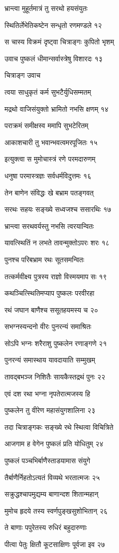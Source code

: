 भ्रान्त्वा मुहूर्तमात्रं तु सरथो हयसंयुतः

स्थितिर्लेभेतिकष्टेन सन्धृतो रणमण्डले १२

स चास्य विक्रमं दृष्ट्वा चित्राङ्गः कुपितो भृशम्

उवाच पुष्कलं धीमान्सर्वास्त्रेषु विशारदः १३

चित्राङ्ग उवाच

त्वया साधुकृतं कर्म सुभटैर्युधिसम्मतम्

मद्रथो वाजिसंयुक्तो भ्रामितो नभसि क्षणम् १४

पराक्रमं समीक्षस्व ममापि सुभटेरितम्

आकाशचारी तु भवान्भवत्वमरपूजितः १५

इत्युक्त्वा स मुमोचास्त्रं रणे परमदारुणम्

धनुषा परमास्त्रज्ञः सर्वधर्मविदुत्तमः १६

तेन बाणेन संविद्धः खे बभ्राम पतङ्गवत्

सरथः सहयः सङ्ख्ये सध्वजश्च ससारथिः १७

भ्रान्त्वा सरथवर्यस्तु नभसि त्वरयान्वितः

यावत्स्थितिं न लभते तावन्मुक्तोऽपरः शरः १८

पुनश्च परिबभ्राम रथः सूतसमन्वितः

तत्कर्मवीक्ष्य पुत्रस्य राज्ञो विस्मयमाप सः १९

कथञ्चित्स्थितिमप्याप पुष्कलः परवीरहा

रथं जघान बाणैश्च ससूतहयमस्य च २०

सभग्नस्यन्दनो वीरः पुनरन्यं समाश्रितः

सोऽपि भग्नः शरैराशु पुष्कलेन रणाङ्गणे २१

पुनरन्यं समास्थाय यावदायाति सम्मुखम्

तावद्बभञ्ज निशितैः सायकैस्तद्रथं पुनः २२

एवं दश रथा भग्ना नृपतेरात्मजस्य हि

पुष्कलेन तु वीरेण महासंयुगशालिना २३

तदा चित्राङ्गकः सङ्ख्ये रथे स्थित्वा विचित्रिते

आजगाम ह वेगेन पुष्कलं प्रति योधितुम् २४

पुष्कलं पञ्चभिर्बाणैस्ताडयामास संयुगे

तैर्बाणैर्निहतोऽत्यतं विव्यथे भरतात्मजः २५

सक्रुद्धश्चापमुद्यम्य बाणान्दश शितान्महान्

मुमोच हृदये तस्य स्वर्णपुङ्खसुशोभितान् २६

ते बाणाः पपुरेतस्य रुधिरं बहुदारुणाः

पीत्वा पेतुः क्षितौ कूटसाक्षिणः पूर्वजा इव २७


